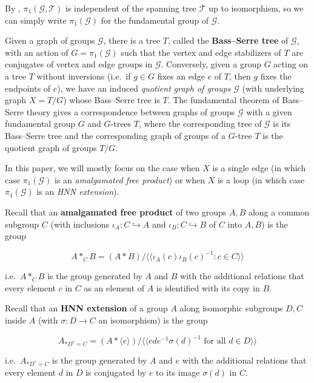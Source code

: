 \documentclass{amsart}
\theoremstyle{plain}
\theoremstyle{definition}
\theoremstyle{remark}
\begin{document}
By \cite[Proposition 20]{Trees}, $\pi_1(\mathcal{G}, \mathcal{T})$ is independent of the spanning tree $\mathcal{T}$ up to isomorphism, so we can simply write $\pi_1(\mathcal{G})$ for the fundamental group of $\mathcal{G}$. 

Given a graph of groups $\mathcal{G}$, there is a tree $T$, called the \textbf{Bass--Serre tree} of $\mathcal{G}$, with an action of $G = \pi_1 (\mathcal{G})$ such that the vertex and edge stabilizers of $T$ are conjugates of vertex and edge groups in $\mathcal{G}$. Conversely, given a group $G$ acting on a tree $T$ without inversions (i.e.\ if $g \in G$ fixes an edge $e$ of $T$, then $g$ fixes the endpoints of $e$), we have an induced \emph{quotient graph of groups} $\mathcal{G}$ (with underlying graph $ X = T/G$) whose Bass--Serre tree is $T$. The fundamental theorem of Bass--Serre theory gives a correspondence between graphs of groups $\mathcal{G}$ with a given fundamental group $G$ and $G$-trees $T$, where the corresponding tree of $\mathcal{G}$ is its Bass--Serre tree and the corresponding graph of groups of a $G$-tree $T$ is the quotient graph of groups $T/G$. 

In this paper, we will mostly focus on the case when $X$ is a single edge (in which case $\pi_1(\mathcal{G})$ is an \textit{amalgamated free product}) or when $X$ is a loop (in which case $\pi_1(\mathcal{G})$ is an \textit{HNN extension}). 

Recall that an \textbf{amalgamated free product} of two groups $A,B$ along a common subgroup $C$ (with inclusions $\iota_A : C \hookrightarrow A$ and $\iota_B : C \hookrightarrow B$ of $C$ into $A,B$) is the group

$$A *_C B = (A * B) / \langle \langle \iota_A(c)\iota_B(c)^{-1} : c \in C \rangle \rangle$$

i.e.\ $A *_C B$ is the group generated by $A$ and $B$ with the additional relations that every element $c$ in $C$ as an element of $A$ is identified with its copy in $B$. 

Recall that an \textbf{HNN extension} of a group $A$ along isomorphic subgroups $D, C$ inside $A$ (with $\sigma: D \to C$ an isomorphism) is the group 

$$A_{* D^e = C} = (A * \langle e \rangle)/ \langle \langle e d e^{-1} \sigma(d)^{-1} \text{ for all $d \in D$} \rangle \rangle$$

i.e.\ $A_{* D^e = C}$ is the group generated by $A$ and $e$ with the additional relations that every element $d$ in $D$ is conjugated by $e$ to its image $\sigma(d)$ in $C$. 
\end{document}
